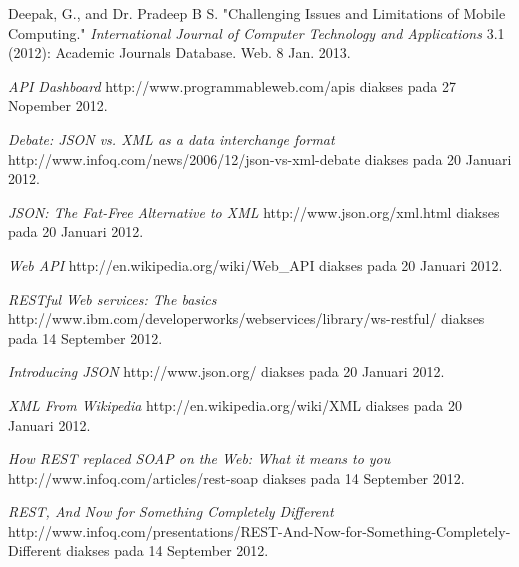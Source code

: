\documentclass[a4paper, 12pt]{report}
\begin{document}
\begin{thebibliography}{99}
\singlespacing 


Deepak, G., and Dr. Pradeep B S. "Challenging Issues and Limitations of Mobile Computing."
  \emph{International Journal of Computer Technology and Applications} 3.1 (2012): Academic Journals Database. Web. 8 Jan. 2013.

  \emph{API Dashboard}
  http://www.programmableweb.com/apis
  diakses pada 27 Nopember 2012.
  
  \emph{Debate: JSON vs. XML as a data interchange format}
  http://www.infoq.com/news/2006/12/json-vs-xml-debate
  diakses pada 20 Januari 2012.
  
  \emph{JSON: The Fat-Free Alternative to XML}
  http://www.json.org/xml.html
  diakses pada 20 Januari 2012.
  
  \emph{Web API}
  http://en.wikipedia.org/wiki/Web\_API
  diakses pada 20 Januari 2012.

  \emph{RESTful Web services: The basics}
  \\http://www.ibm.com/developerworks/webservices/library/ws-restful/
  diakses pada 14 September 2012.

  \emph{Introducing JSON} http://www.json.org/
  diakses pada 20 Januari 2012.
  
  \emph{XML From Wikipedia} http://en.wikipedia.org/wiki/XML
  diakses pada 20 Januari 2012.
  
  \emph{How REST replaced SOAP on the Web: What it means to you}
  http://www.infoq.com/articles/rest-soap
  diakses pada 14 September 2012.
  
  \emph{REST, And Now for Something Completely Different}
  http://www.infoq.com/presentations/REST-And-Now-for-Something-Completely-Different
  diakses pada 14 September 2012.
 
\end{thebibliography}
\end{document}
